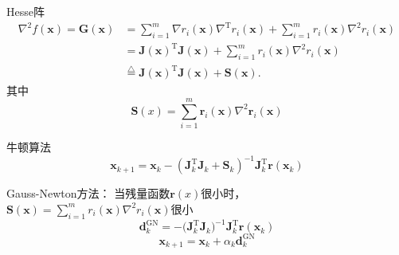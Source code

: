 \begin{note}
    Hesse阵
    \[
        \begin{aligned}
            \nabla^{2}f(\boldsymbol{x})=\boldsymbol{G(x)}& =\sum_{i=1}^{m}\nabla r_{i}(\boldsymbol{x})\nabla^{\mathrm{T}}r_{i}(\boldsymbol{x})+\sum_{i=1}^{m}r_{i}(\boldsymbol{x})\nabla^{2}r_{i}(\boldsymbol{x})  \\
            & = \boldsymbol{J}(\boldsymbol{x})^{\mathrm{T}}\boldsymbol{J}(\boldsymbol{x})+\sum_{i=1}^{m}r_{i}(\boldsymbol{x})\nabla^{2}r_{i}(\boldsymbol{x}) \\
            &\overset{\triangle}{\operatorname*{=}}\boldsymbol{J}(\boldsymbol{x})^{\mathrm{T}}\boldsymbol{J}(\boldsymbol{x})+\boldsymbol{S}(\boldsymbol{x}).
        \end{aligned}
    \]
    其中
    \[
        \boldsymbol{S}(x)=\sum_{i=1}^{m}\boldsymbol{r}_{i}(\boldsymbol{x})\nabla^{2}\boldsymbol{r}_{i}(\boldsymbol{x})
    \]
\end{note}

\begin{note}
    牛顿算法
    \[
    \boldsymbol{x}_{k+1}=\boldsymbol{x}_k-\left(\boldsymbol{J}_k^\mathrm{T}\boldsymbol{J}_k+\boldsymbol{S}_k\right)^{-1}\boldsymbol{J}_k^\mathrm{T}\boldsymbol{r}(\boldsymbol{x}_k)
    \]
\end{note}
\begin{note}
    Gauss-Newton方法：
    当残量函数$\boldsymbol{r}(x)$很小时，$\boldsymbol{S}(\boldsymbol{x})=\sum_{i=1}^{m}r_{i}(\boldsymbol{x})\nabla^{2}r_{i}(\boldsymbol{x})$很小
    \[
        \boldsymbol{d}_{k}^{\mathrm{GN}}=-\bigl(\boldsymbol{J}_{k}^{\mathrm{T}}\boldsymbol{J}_{k}\bigr)^{-1}\boldsymbol{J}_{k}^{\mathrm{T}}\boldsymbol{r}(\boldsymbol{x}_{k})
    \]
    \[
        \boldsymbol{x}_{k+1} = \boldsymbol{x}_k+\alpha_k \boldsymbol{d}_{k}^{\mathrm{GN}} 
    \]
\end{note}